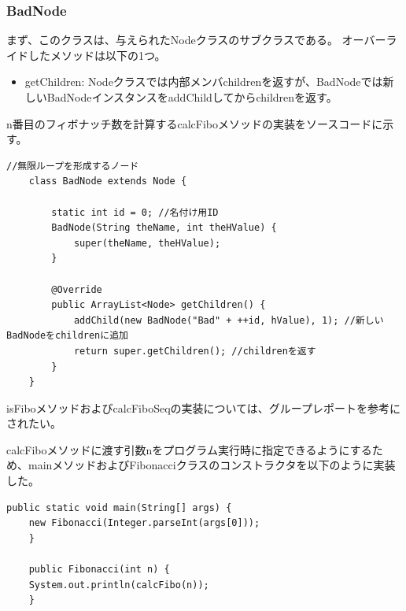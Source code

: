 \documentclass{jarticle}
\begin{document}
\subsubsection{BadNode}

まず、このクラスは、与えられたNodeクラスのサブクラスである。
オーバーライドしたメソッドは以下の1つ。
\begin{itemize}
\item getChildren: Nodeクラスでは内部メンバchildrenを返すが、BadNodeでは新しいBadNodeインスタンスをaddChildしてからchildrenを返す。

\end{itemize}

n番目のフィボナッチ数を計算するcalcFiboメソッドの実装をソースコードに示す。
\begin{lstlisting}[caption=BadNodeクラス,label=src:BadNode]
    //無限ループを形成するノード
    class BadNode extends Node {

        static int id = 0; //名付け用ID
        BadNode(String theName, int theHValue) {
            super(theName, theHValue);
        }

        @Override
        public ArrayList<Node> getChildren() {
            addChild(new BadNode("Bad" + ++id, hValue), 1); //新しいBadNodeをchildrenに追加
            return super.getChildren(); //childrenを返す
        }
    }
\end{lstlisting}

isFiboメソッドおよびcalcFiboSeqの実装については、グループレポートを参考にされたい。

calcFiboメソッドに渡す引数nをプログラム実行時に指定できるようにするため、mainメソッドおよびFibonacciクラスのコンストラクタを以下のように実装した。
\begin{lstlisting}[caption=mainメソッドとコンストラクタ,label=src:main]
    public static void main(String[] args) {
	new Fibonacci(Integer.parseInt(args[0]));
    }

    public Fibonacci(int n) {
	System.out.println(calcFibo(n));
    }
\end{lstlisting}
\end{document}
